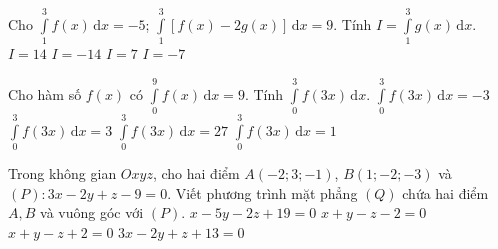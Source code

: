 \begin{ex}%
	Cho $\displaystyle\int\limits_{1}^{3}f(x)\mathrm{\,d}x=-5$; $\displaystyle\int\limits_{1}^{3}\left[f(x)-2g(x)\right]\mathrm{\,d}x=9$. Tính $I=\displaystyle\int\limits_{1}^{3}g(x)\mathrm{\,d}x$.
	\choice
	{ $I=14$}
	{$I=-14$}
	{ $I=7$}
	{\True $I=-7$}
	
\end{ex}

\begin{ex}%
	Cho hàm số $f(x)$ có $\displaystyle\int\limits_{0}^{9}f(x)\mathrm{\,d}x=9$. Tính $\displaystyle\int\limits_{0}^{3}f(3x)\mathrm{\,d}x$.
	\choice
	{ $\displaystyle\int\limits_{0}^{3}f(3x)\mathrm{\,d}x=-3$}
	{\True $\displaystyle\int\limits_{0}^{3}f(3x)\mathrm{\,d}x=3$}
	{ $\displaystyle\int\limits_{0}^{3}f(3x)\mathrm{\,d}x=27$}
	{ $\displaystyle\int\limits_{0}^{3}f(3x)\mathrm{\,d}x=1$}
	
\end{ex}

\begin{ex}%
	Trong không gian $Oxyz$, cho hai điểm $A(-2;3;-1)$, $B(1;-2;-3)$ và $(P)\colon 3x-2y+z-9=0$. Viết phương trình mặt phẳng $(Q)$ chứa hai điểm $A,B$ và vuông góc với $(P)$.
	\choice
	{ $x-5y-2z+19=0$}
	{\True $x+y-z-2=0$}
	{ $x+y-z+2=0$}
	{ $3x-2y+z+13=0$}
	
\end{ex}

